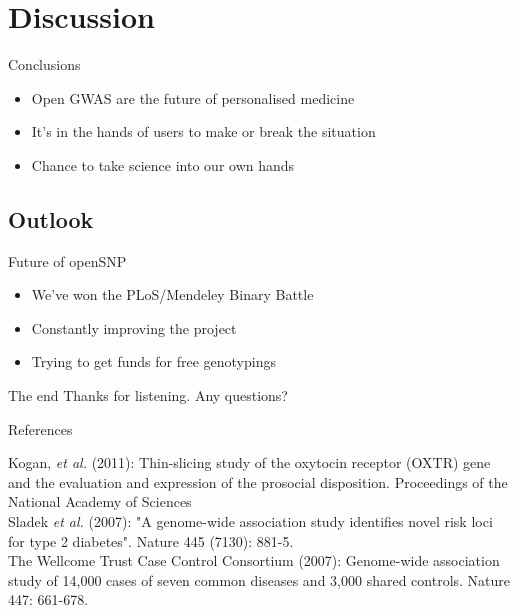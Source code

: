 \documentclass[12pt,a4paper]{beamer}
\begin{document}
\section{Discussion}
\begin{frame}{Conclusions}
\begin{itemize}
\item Open GWAS are the future of personalised medicine
\pause \item It's in the hands of users to make or break the situation
\pause \item Chance to take science into our own hands %
\end{itemize}
\end{frame}

\subsection{Outlook}
\begin{frame}{Future of openSNP}
\begin{itemize}
\item We've won the PLoS/Mendeley Binary Battle
\pause \item Constantly improving the project
\pause \item Trying to get funds for free genotypings
\end{itemize}
\end{frame}

\begin{frame}{The end}
Thanks for listening. Any questions?
\end{frame}


\begin{frame}{References}
\begin{tiny}
Kogan, \textit{et al.} (2011): Thin-slicing study of the oxytocin receptor (OXTR) gene and the evaluation and expression of the prosocial disposition. Proceedings of the National Academy of Sciences\\
Sladek \textit{et al.} (2007): "A genome-wide association study identifies novel risk loci for type 2 diabetes". Nature 445 (7130): 881-5. \\
The Wellcome Trust Case Control Consortium  (2007): Genome-wide association study of 14,000 cases of seven common diseases and 3,000 shared controls. Nature 447: 661-678.\\
\end{tiny}
\end{frame}
\end{document}
